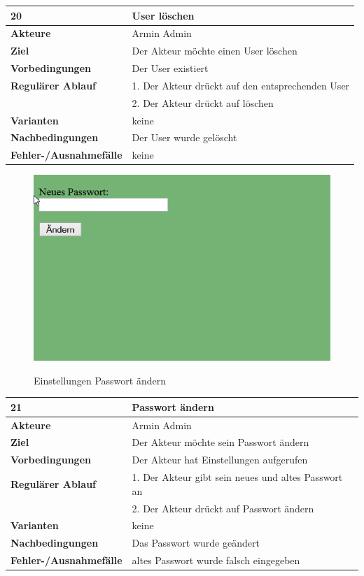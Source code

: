 \documentclass[fontsize=12pt,paper=a4,twoside]{scrartcl}
\begin{document}
\begin{table}
	[H] \label{20} 
	\begin{tabular}
		{|l|p{10cm}|} \hline \textbf{20} & \textbf{User löschen} \\
		\hline \textbf{Akteure} & Armin Admin\\
		\hline \textbf{Ziel} & Der Akteur möchte einen User löschen\\
		\hline \textbf{Vorbedingungen} & Der User existiert\\
		\hline \textbf{Regulärer Ablauf} & 1. Der Akteur drückt auf den entsprechenden User\\
		&2. Der Akteur drückt auf löschen\\
		\hline \textbf{Varianten} & keine \\
		\hline \textbf{Nachbedingungen} & Der User wurde gelöscht\\
		\hline \textbf{Fehler-/Ausnahmefälle} & keine \\
		\hline 
	\end{tabular}
\end{table}

\begin{figure}
	[H] \caption{Einstellungen Passwort ändern} 
	\includegraphics[width=0.6
	\textwidth]{Bilder/WebseiteEinst.png} \label{pic:ques} 
\end{figure}

\begin{table}
	[H] \label{21} 
	\begin{tabular}
		{|l|p{10cm}|} \hline \textbf{21} & \textbf{Passwort ändern} \\
		\hline \textbf{Akteure} & Armin Admin\\
		\hline \textbf{Ziel} & Der Akteur möchte sein Passwort ändern\\
		\hline \textbf{Vorbedingungen} & Der Akteur hat Einstellungen aufgerufen\\
		\hline \textbf{Regulärer Ablauf} & 1. Der Akteur gibt sein neues und altes Passwort an\\
		&2. Der Akteur drückt auf Passwort ändern\\
		\hline \textbf{Varianten} & keine \\
		\hline \textbf{Nachbedingungen} & Das Passwort wurde geändert\\
		\hline \textbf{Fehler-/Ausnahmefälle} & altes Passwort wurde falsch eingegeben \\
		\hline 
	\end{tabular}
\end{table}
\end{document}
